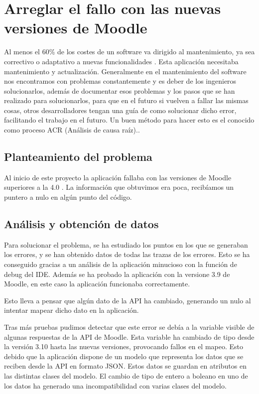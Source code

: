 
\section{Arreglar el fallo con las nuevas versiones de Moodle}
Al menos el 60\% de los costes de un software va dirigido al mantenimiento, ya sea correctivo o adaptativo a nuevas funcionalidades \cite{costos-mantenimiento}. Esta aplicación necesitaba mantenimiento y actualización. Generalmente en el mantenimiento del software nos encontramos con problemas constantemente y es deber de los ingenieros solucionarlos, además de documentar esos problemas y los pasos que se han realizado para solucionarlos, para que en el futuro si vuelven a fallar las mismas cosas, otros desarrolladores tengan una guía de como solucionar dicho error, facilitando el trabajo en el futuro. Un buen método para hacer esto es el conocido como proceso ACR (Análisis de causa raíz).\cite{proceso-acr}.

\subsection{Planteamiento del problema}
Al inicio de este proyecto la aplicación fallaba con las versiones de Moodle superiores a la 4.0 . La información que obtuvimos era poca, recibíamos un puntero a nulo en algún punto del código.
\subsection{Análisis y obtención de datos}
Para solucionar el problema, se ha estudiado los puntos en los que se generaban los errores, y se han obtenido datos de todas las trazas de los errores. Esto se ha conseguido gracias a un análisis de la aplicación minucioso con la función de debug del IDE.
Además se ha probado la aplicación con la versione 3.9 de Moodle, en este caso la aplicación funcionaba correctamente.

Esto lleva a pensar que algún dato de la API ha cambiado, generando un nulo al intentar mapear dicho dato en la aplicación.

Tras más pruebas pudimos detectar que este error se debía a la variable visible de algunas respuestas de la API de Moodle. Esta variable ha cambiado de tipo desde la versión 3.10 hasta las nuevas versiones, provocando fallos en el mapeo. Esto debido que la aplicación dispone de un modelo que representa los datos que se reciben desde la API en formato JSON. Estos datos se guardan en atributos en las distintas clases del modelo. El cambio de tipo de entero a boleano en uno de los datos ha generado una incompatibilidad con varias clases del modelo. 

